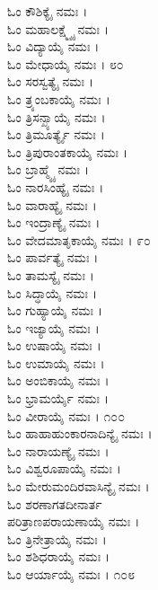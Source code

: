 \begin{multicols}{2}
ಓಂ ಕೌಶಿಕ್ಯೈ ನಮಃ ।\\
ಓಂ ಮಹಾಲಕ್ಷ್ಮ್ಯೈ ನಮಃ ।\\
ಓಂ ವಿದ್ಯಾಯೈ ನಮಃ ।\\
ಓಂ ಮೇಧಾಯೈ ನಮಃ । ೮೦\\
ಓಂ ಸರಸ್ವತ್ಯೈ ನಮಃ ।\\
ಓಂ ತ್ರ್ಯಂಬಕಾಯೈ ನಮಃ ।\\
ಓಂ ತ್ರಿಸನ್ಖ್ಯಾಯೈ ನಮಃ ।\\
ಓಂ ತ್ರಿಮೂರ್ತ್ಯೈ ನಮಃ ।\\
ಓಂ ತ್ರಿಪುರಾಂತಕಾಯೈ ನಮಃ ।\\
ಓಂ ಬ್ರಾಹ್ಮ್ಯೈ ನಮಃ ।\\
ಓಂ ನಾರಸಿಂಹ್ಯೈ ನಮಃ ।\\
ಓಂ ವಾರಾಹ್ಯೈ ನಮಃ ।\\
ಓಂ ಇಂದ್ರಾಣ್ಯೈ ನಮಃ ।\\
ಓಂ ವೇದಮಾತೃಕಾಯೈ ನಮಃ । ೯೦\\
ಓಂ ಪಾರ್ವತ್ಯೈ ನಮಃ ।\\
ಓಂ ತಾಮಸ್ಯೈ ನಮಃ ।\\
ಓಂ ಸಿದ್ಧಾಯೈ ನಮಃ ।\\
ಓಂ ಗುಹ್ಯಾಯೈ ನಮಃ ।\\
ಓಂ ಇಜ್ಯಾಯೈ ನಮಃ ।\\
ಓಂ ಉಷಾಯೈ ನಮಃ ।\\
ಓಂ ಉಮಾಯೈ ನಮಃ ।\\
ಓಂ ಅಂಬಿಕಾಯೈ ನಮಃ ।\\
ಓಂ ಭ್ರಾಮರ್ಯೈ ನಮಃ ।\\
ಓಂ ವೀರಾಯೈ ನಮಃ । ೧೦೦\\
ಓಂ ಹಾಹಾಹುಂಕಾರನಾದಿನ್ಯೈ ನಮಃ ।\\
ಓಂ ನಾರಾಯಣ್ಯೈ ನಮಃ ।\\
ಓಂ ವಿಶ್ವರೂಪಾಯೈ ನಮಃ ।\\
ಓಂ ಮೇರುಮಂದಿರವಾಸಿನ್ಯೈ ನಮಃ ।\\
ಓಂ ಶರಣಾಗತದೀನಾರ್ತ\\ಪರಿತ್ರಾಣಪರಾಯಣಾಯೈ ನಮಃ ।\\
ಓಂ ತ್ರಿನೇತ್ರಾಯೈ ನಮಃ ।\\
ಓಂ ಶಶಿಧರಾಯೈ ನಮಃ ।\\
ಓಂ ಆರ್ಯಾಯೈ ನಮಃ । ೧೦೮
\end{multicols}
